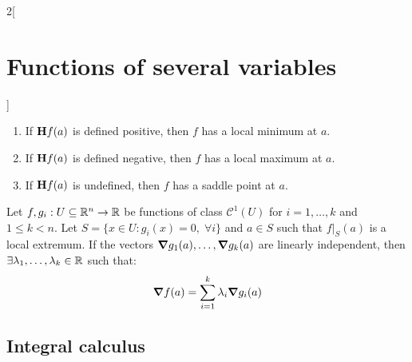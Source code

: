 \documentclass[../../../main_math.tex]{subfiles}
\begin{document}
\begin{multicols}{2}[\section{Functions of several variables}]
\begin{theorem}
    \begin{enumerate}
      \item If $\boldsymbol{\mathrm{H}}f(a)$ is defined positive, then $f$ has a local minimum at $a$.
      \item If $\boldsymbol{\mathrm{H}}f(a)$ is defined negative, then $f$ has a local maximum at $a$.
      \item If $\boldsymbol{\mathrm{H}}f(a)$ is undefined, then $f$ has a saddle point at $a$.
    \end{enumerate}
  \end{theorem}
  \begin{theorem}
    Let $f,g_i:U\subseteq\mathbb{R}^n\rightarrow\mathbb{R} $ be functions of class $\mathcal{C}^1(U)$ for $i=1,\ldots,k$ and $1\leq k<n$. Let $S=\{x\in U:g_i(x)=0,\;\forall i\}$ and $a\in S$ such that $f|_S(a)$ is a local extremum. If the vectors $\grad g_1(a),\ldots,\grad g_k(a)$ are linearly independent, then $\exists\lambda_1,\ldots,\lambda_k\in\mathbb{R} $ such that: $$\grad f(a)=\sum_{i=1}^k\lambda_i\grad g_i(a)$$
  \end{theorem}
  \subsection{Integral calculus}

\end{multicols}
\end{document}
